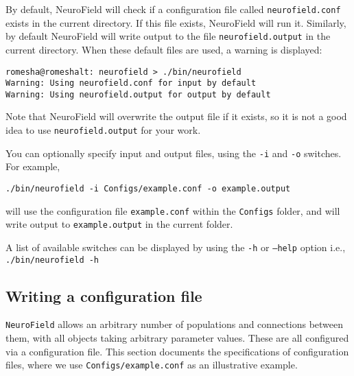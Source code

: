 \documentclass[12pt,a4paper]{article}
\newcommand{\type}[1]{ {\small\small\tt #1} }
\newcommand{\NF}[0]{ \type{NeuroField}}
\begin{document}
By default, NeuroField will check if a configuration file called \type{neurofield.conf} exists in the current directory. If this file exists, NeuroField will run it. Similarly, by default NeuroField will write output to the file \type{neurofield.output} in the current directory. When these default files are used, a warning is displayed:

\begin{lstlisting}
romesha@romeshalt: neurofield > ./bin/neurofield
Warning: Using neurofield.conf for input by default
Warning: Using neurofield.output for output by default
\end{lstlisting}

Note that NeuroField will overwrite the output file if it exists, so it is not a good idea to use \type{neurofield.output} for your work.

You can optionally specify input and output files, using the \type{-i} and \type{-o} switches. For example,

\begin{lstlisting}
./bin/neurofield -i Configs/example.conf -o example.output
\end{lstlisting}

will use the configuration file \type{example.conf} within the \type{Configs} folder, and will write output to \type{example.output} in the current folder.

A list of available switches can be displayed by using the \type{-h} or \type{--help} option i.e., \type{./bin/neurofield -h}

\subsection{Writing a configuration file}
\label{sec:config}

\NF allows an arbitrary number of populations and connections between them, with all objects taking arbitrary parameter values. These are all configured via a configuration file. This section documents the specifications of configuration files, where we use \type{Configs/example.conf} as an illustrative example.
\end{document}
